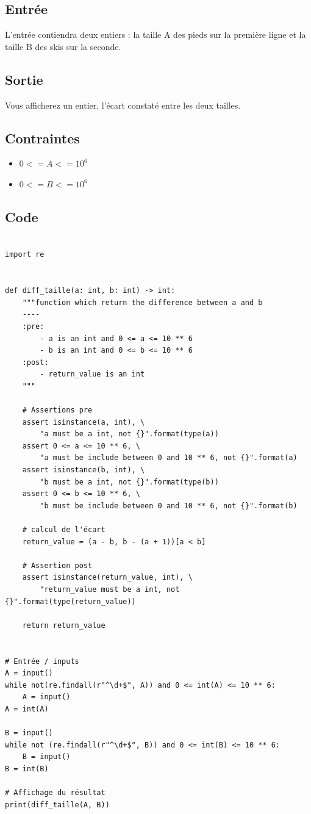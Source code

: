 \documentclass{article}
\begin{document}
        \subsection{Entrée}
            L’entrée contiendra deux entiers : la taille A des pieds sur la première ligne et la taille B
            des skis sur la seconde.
        \subsection{Sortie}
            Vous afficherez un entier, l’écart constaté entre les deux tailles.
        \subsection{Contraintes}
            \begin{itemize}
                \item $0 <= A <= 10^6$
                \item $0 <= B <= 10^6$
            \end{itemize}
        \subsection{Code}
            \begin{verbatim}

import re


def diff_taille(a: int, b: int) -> int:
    """function which return the difference between a and b
    ----
    :pre:
        - a is an int and 0 <= a <= 10 ** 6
        - b is an int and 0 <= b <= 10 ** 6
    :post:
        - return_value is an int
    """

    # Assertions pre
    assert isinstance(a, int), \
        "a must be a int, not {}".format(type(a))
    assert 0 <= a <= 10 ** 6, \
        "a must be include between 0 and 10 ** 6, not {}".format(a)
    assert isinstance(b, int), \
        "b must be a int, not {}".format(type(b))
    assert 0 <= b <= 10 ** 6, \
        "b must be include between 0 and 10 ** 6, not {}".format(b)

    # calcul de l'écart
    return_value = (a - b, b - (a + 1))[a < b]

    # Assertion post
    assert isinstance(return_value, int), \
        "return_value must be a int, not {}".format(type(return_value))

    return return_value


# Entrée / inputs
A = input()
while not(re.findall(r"^\d+$", A)) and 0 <= int(A) <= 10 ** 6:
    A = input()
A = int(A)

B = input()
while not (re.findall(r"^\d+$", B)) and 0 <= int(B) <= 10 ** 6:
    B = input()
B = int(B)

# Affichage du résultat
print(diff_taille(A, B))
            \end{verbatim}
        \newpage
\end{document}
